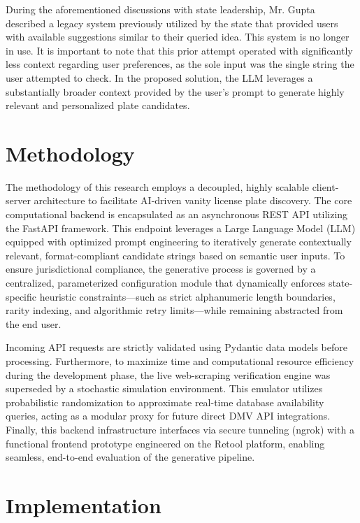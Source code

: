 \documentclass{article} %
\begin{document}
During the aforementioned discussions with state leadership, Mr. Gupta described a legacy system previously utilized by the state that provided users with available suggestions similar to their queried idea. This system is no longer in use. It is important to note that this prior attempt operated with significantly less context regarding user preferences, as the sole input was the single string the user attempted to check. In the proposed solution, the LLM leverages a substantially broader context provided by the user's prompt to generate highly relevant and personalized plate candidates.

\section{Methodology}

The methodology of this research employs a decoupled, highly scalable client-server architecture to facilitate AI-driven vanity license plate discovery. The core computational backend is encapsulated as an asynchronous REST API utilizing the FastAPI framework. This endpoint leverages a Large Language Model (LLM) equipped with optimized prompt engineering to iteratively generate contextually relevant, format-compliant candidate strings based on semantic user inputs. To ensure jurisdictional compliance, the generative process is governed by a centralized, parameterized configuration module that dynamically enforces state-specific heuristic constraints—such as strict alphanumeric length boundaries, rarity indexing, and algorithmic retry limits—while remaining abstracted from the end user. 

Incoming API requests are strictly validated using Pydantic data models before processing. Furthermore, to maximize time and computational resource efficiency during the development phase, the live web-scraping verification engine was superseded by a stochastic simulation environment. This emulator utilizes probabilistic randomization to approximate real-time database availability queries, acting as a modular proxy for future direct DMV API integrations. Finally, this backend infrastructure interfaces via secure tunneling (ngrok) with a functional frontend prototype engineered on the Retool platform, enabling seamless, end-to-end evaluation of the generative pipeline.

\section{Implementation}
\end{document}
